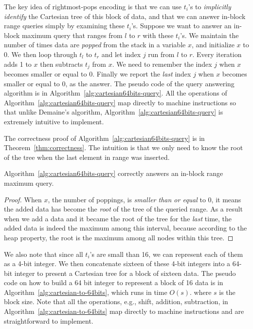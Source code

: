 The key idea of rightmost-pops encoding is that we can use $t_i$'s to
{\em implicitly identify} the Cartesian tree of this block of data,
and that we can answer in-block range queries simply by examining
these $t_i$'s.  Suppose we want to answer an in-block maximum query
that ranges from $l$ to $r$ with these $t_i$'s.  We maintain the
number of times data are {\em popped} from the stack in a variable
$x$, and initialize $x$ to 0.  We then loop through $t_l$ to $t_r$ and
let index $j$ run from $l$ to $r$.  Every iteration adds 1 to $x$ then
subtracts $t_j$ from $x$.  We need to remember the index $j$ when $x$
becomes smaller or equal to 0.  Finally we report the {\em last} index
$j$ when $x$ becomes smaller or equal to 0, as the answer.  The pseudo
code of the query answering algorithm is in
Algorithm~\ref{alg:cartesian64bits-query}.  All the operations of
Algorithm~\ref{alg:cartesian64bits-query} map directly to machine
instructions so that unlike Demaine's algorithm,
Algorithm~\ref{alg:cartesian64bits-query} is extremely intuitive to
implement.



The correctness proof of Algorithm~\ref{alg:cartesian64bits-query} is
in Theorem~\ref{thm:correctness}.  The intuition is that we only need
to know the root of the tree when the last element in range was
inserted.

\begin{theorem} \label{thm:correctness}
  Algorithm~\ref{alg:cartesian64bits-query} correctly answers an
  in-block range maximum query.
\end{theorem}
\begin{proof}
When $x$, the number of poppings, is {\em smaller than or equal} to 0,
it means the added data has become the {\em root} of the tree of the
queried range.  As a result when we add a data and it became the root
of the tree for the {\em last} time, the added data is indeed the
maximum among this interval, because according to the heap property,
the root is the maximum among all nodes within this tree.
\end{proof}

We also note that since all $t_i$'s are small than 16, we can
represent each of them as a 4-bit integer.  We then concatenate
sixteen of these 4-bit integers into a 64-bit integer to present a
Cartesian tree for a block of sixteen data.  The pseudo code on how to
build a 64 bit integer to represent a block of 16 data is in
Algorithm~\ref{alg:cartesian-to-64bits}, which runs in time
$O(s)$. where $s$ is the block size.  Note that all the operations,
e.g., shift, addition, subtraction, in
Algorithm~\ref{alg:cartesian-to-64bits} map directly to machine
instructions and are straightforward to implement.

